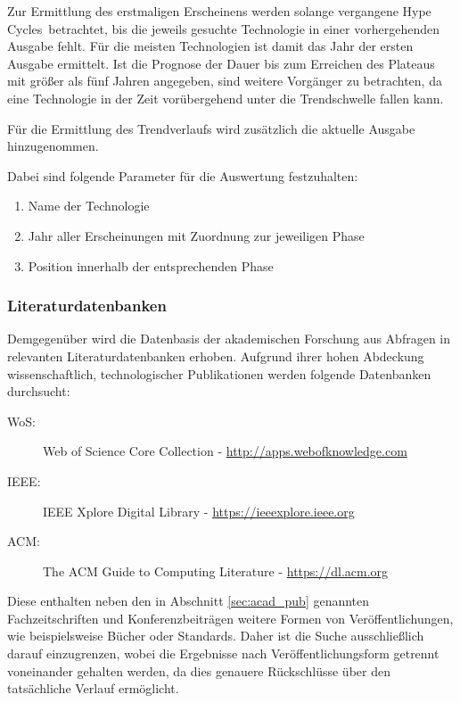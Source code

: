 Zur Ermittlung des erstmaligen Erscheinens werden solange vergangene \glqq Hype Cycles\grqq~betrachtet, bis die jeweils gesuchte Technologie in einer vorhergehenden Ausgabe fehlt. Für die meisten Technologien ist damit das Jahr der ersten Ausgabe ermittelt. Ist die Prognose der Dauer bis zum Erreichen des \glqq Plateaus\grqq~ mit größer als fünf Jahren angegeben, sind weitere Vorgänger zu betrachten, da eine Technologie in der Zeit vorübergehend unter die Trendschwelle fallen kann.

Für die Ermittlung des Trendverlaufs wird zusätzlich die aktuelle Ausgabe hinzugenommen.

Dabei sind folgende Parameter für die Auswertung festzuhalten:

\begin{enumerate}
	\item Name der Technologie
	\item Jahr aller Erscheinungen mit Zuordnung zur jeweiligen Phase
	\item Position innerhalb der entsprechenden Phase
\end{enumerate}

\subsubsection{Literaturdatenbanken}\label{sec:lit_data}
Demgegenüber wird die Datenbasis der akademischen Forschung aus Abfragen in relevanten Literaturdatenbanken erhoben. Aufgrund ihrer hohen Abdeckung wissenschaftlich, technologischer Publikationen werden folgende Datenbanken durchsucht:
\begin{description}
	\item [\acs{WoS}:] Web of Science Core Collection - \url{http://apps.webofknowledge.com}
	\item [\acs{IEEE}:] IEEE Xplore Digital Library - \url{https://ieeexplore.ieee.org}
	\item [\acs{ACM}:] The ACM Guide to Computing Literature - \url{https://dl.acm.org}
\end{description}

Diese enthalten neben den in Abschnitt \ref{sec:acad_pub} genannten Fachzeitschriften und Konferenzbeiträgen weitere Formen von Veröffentlichungen, wie beispielsweise Bücher oder Standards. Daher ist die Suche ausschließlich darauf einzugrenzen, wobei die Ergebnisse nach Veröffentlichungsform getrennt voneinander gehalten werden, da dies genauere Rückschlüsse über den tatsächliche Verlauf ermöglicht.

